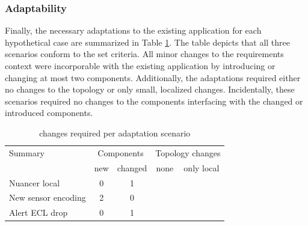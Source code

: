 \subsubsection{Adaptability}
Finally, the necessary adaptations to the existing application for each hypothetical case are summarized in Table \ref{table:adaptations}. The table depicts that all three scenarios conform to the set criteria. All minor changes to the requirements context were incorporable with the existing application by introducing or changing at most two components. Additionally, the adaptations required either no changes to the topology or only small, localized changes. Incidentally, these scenarios required no changes to the components interfacing with the changed or introduced components.

\begin{table}
\centering
\begin{tabular}{|l||c|c||c|c|} \hline
Summary				& \multicolumn{2}{c||}{Components}		& \multicolumn{2}{c|}{Topology changes} \\ 
					& new 	& changed 	& none 		& only local  \\ \hline 
Nuancer local		& 0		& 1			&			& \cmark \\ \hline
New sensor encoding	& 2		& 0			& 			& \cmark \\ \hline
Alert ECL drop		& 0		& 1			& \cmark	&		 \\ \hline
\end{tabular}
\caption{changes required per adaptation scenario}
\label{table:adaptations}
\end{table}


